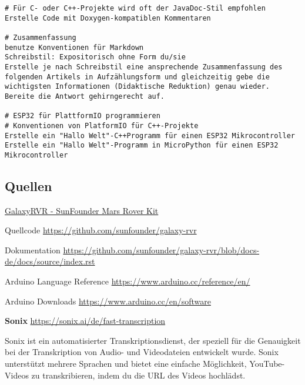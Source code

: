 \documentclass{vorlage-design-main}
\begin{document}
\begin{lstlisting}
# Für C- oder C++-Projekte wird oft der JavaDoc-Stil empfohlen
Erstelle Code mit Doxygen-kompatiblen Kommentaren

# Zusammenfassung
benutze Konventionen für Markdown
Schreibstil: Expositorisch ohne Form du/sie
Erstelle je nach Schreibstil eine ansprechende Zusammenfassung des folgenden Artikels in Aufzählungsform und gleichzeitig gebe die wichtigsten Informationen (Didaktische Reduktion) genau wieder. Bereite die Antwort gehirngerecht auf.

# ESP32 für PlattformIO programmieren
# Konventionen von PlatformIO für C++-Projekte
Erstelle ein "Hallo Welt"-C++Programm für einen ESP32 Mikrocontroller 
Erstelle ein "Hallo Welt"-Programm in MicroPython für einen ESP32 Mikrocontroller 
\end{lstlisting}

\hypertarget{quellen}{%
\subsection{Quellen}\label{quellen}}

\href{https://docs.sunfounder.com/projects/galaxy-rvr/de/latest/index.html}{GalaxyRVR
- SunFounder Mars Rover Kit}

Quellcode \url{https://github.com/sunfounder/galaxy-rvr}

Dokumentation
\url{https://github.com/sunfounder/galaxy-rvr/blob/docs-de/docs/source/index.rst}

Arduino Language Reference \url{https://www.arduino.cc/reference/en/}

Arduino Downloads \url{https://www.arduino.cc/en/software}

\textbf{Sonix} \url{https://sonix.ai/de/fast-transcription}

Sonix ist ein automatisierter Transkriptionsdienst, der speziell für die
Genauigkeit bei der Transkription von Audio- und Videodateien entwickelt
wurde. Sonix unterstützt mehrere Sprachen und bietet eine einfache
Möglichkeit, YouTube-Videos zu transkribieren, indem du die URL des
Videos hochlädst.
\end{document}
